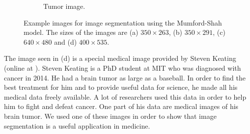 \documentclass[abstracton]{scrreprt}
\begin{document}
\begin{figure}[!ht]
\begin{subfigure}[b]{0.25\textwidth}
                    \caption{Tumor image.}
                \end{subfigure}
                \caption[Example images for segmentation.]{Example images for image segmentation using the Mumford-Shah model. The sizes of the images are (a) $350 \times 263$, (b) $350 \times 291$, (c) $640 \times 480$ and (d) $400 \times 535$.}
            \label{fig:example_images_segmentation}
            \end{figure}
            
            The image seen in (d) is a special medical image provided by Steven Keating (online at \cite{Keating}). Steven Keating is a PhD student at MIT who was diagnosed with cancer in 2014. He had a brain tumor as large as a baseball. In order to find the best treatment for him and to provide useful data for science, he made all his medical data freely available. A lot of researchers used this data in order to help him to fight and defeat cancer. One part of his data are medical images of his brain tumor. We used one of these images in order to show that image segmentation is a useful application in medicine.\\
\end{document}
